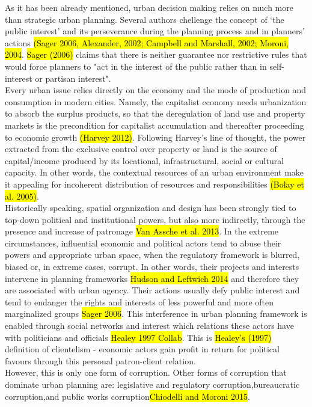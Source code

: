 \documentclass[11pt]{report}
\begin{document}
As it has been already mentioned, urban decision making relies on much more than strategic urban planning.
Several authors chellenge the concept of ‘the public interest’ and its perseverance during the planning process and in planners' actions \hl{(Sager 2006, Alexander, 2002; Campbell and Marshall, 2002; Moroni, 2004}. \hl{Sager (2006)} claims that there is neither guarantee nor restrictive rules that would force planners to "act in the interest of the public rather than in self-interest or partisan interest".
\\
Every urban issue relies directly on the economy  and  the  mode  of  production  and  consumption  in  modern  cities.  Namely,  the  capitalist  economy  needs urbanization to absorb the surplus products, so that the deregulation of land use and property markets is the precondition for capitalist accumulation and thereafter proceeding to economic growth \hl{(Harvey 2012)}. Following Harvey’s line of thought, the power  extracted  from  the  exclusive  control  over  property  or  land  is  the  source  of  capital/income  produced  by  its  locational, infrastructural, social or cultural capacity. In other words, the contextual resources of an urban environment make it appealing for incoherent distribution of resources and responsibilities \hl{(Bolay et al. 2005)}.
\\
Historically speaking, spatial organization and design has been strongly tied to top-down political and institutional powers, but also more indirectly, through the presence and increase of patronage
\hl{Van Assche et al. 2013}.
In the extreme circumstances, influential economic and political actors tend to abuse their powers and appropriate urban space, when the regulatory framework is blurred, biased or, in extreme cases, corrupt. In other words, their projects and interests intervene in planning frameworks \hl{Hudson and Leftwich 2014} and therefore they are associated with urban agency.
Their actions usually defy public interest and tend to endanger the rights and interests of less powerful and more often marginalized groups \hl{Sager 2006}.
This interference in urban planning framework is enabled through social networks and interest which relations these actors have with politicians and officials \hl{Healey 1997 Collab}. This is \hl{Healey's (1997)} definition of clientelism - economic actors gain profit in return for political favours through this personal patron-client relation.
\\
However, this is only one form of corruption.
Other forms of corruption that dominate urban planning are: legislative and regulatory corruption,\footnotemark bureaucratic corruption,\footnotemark and public works corruption\footnotemark \hl{Chiodelli and Moroni 2015}. 
\end{document}
